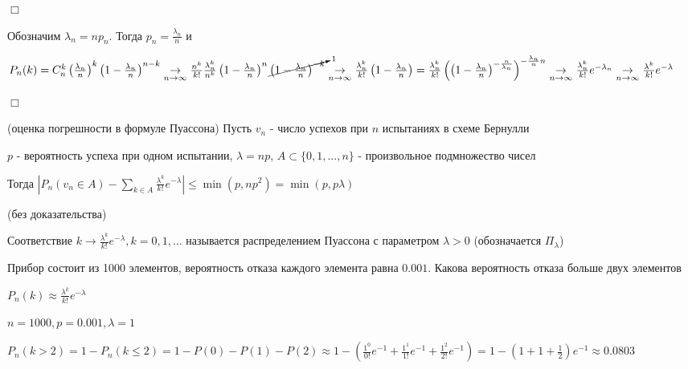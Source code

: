 \documentclass[12pt]{article}
\begin{document}
    \begin{MyProof}
        $\Box$

        Обозначим $\lambda_n = n p_n$. Тогда $p_n = \frac{\lambda_n}{n}$ и

        $P_n(k) = C^k_n \left(\frac{\lambda_n}{n}\right)^k \left(1 - \frac{\lambda_n}{n}\right)^{n - k} \underset{n \to \infty}{\rightarrow} \frac{n^k}{k!} \frac{\lambda^k_n}{n^k} \left(1 - \frac{\lambda_n}{n}\right)^n \cancelto{1}{\left(1 - \frac{\lambda_n}{n}\right)^{-k}}
        \underset{n \to \infty}{\rightarrow} \frac{\lambda_n^k}{k!} \left(1 - \frac{\lambda_n}{n}\right) = \frac{\lambda_n^k}{k!} \left(\left(1 - \frac{\lambda_n}{n}\right)^{-\frac{n}{\lambda_n}}\right)^{-\frac{\lambda_n}{n}n} \underset{n \to \infty}{\rightarrow} \frac{\lambda_n^k}{k!} e^{-\lambda_n} \underset{n \to \infty}{\rightarrow} \frac{\lambda^k}{k!} e^{-\lambda}$

        $\Box$
    \end{MyProof}

    \begin{MyTheorem}
         (оценка погрешности в формуле Пуассона) Пусть $v_n$ - число успехов при $n$ испытаниях в схеме Бернулли

        $p$ - вероятность успеха при одном испытании, $\lambda = np$, $A \subset \{0, 1, \dots, n\}$ - произвольное подмножество чисел

        Тогда $|P_n (v_n \in A) - \sum_{k \in A} \frac{\lambda^k}{k!} e^{-\lambda}| \leq \min (p, np^2) = \min (p, p\lambda)$

        (без доказательства)
    \end{MyTheorem}

    \Def Соответствие $k \to \frac{\lambda^k}{k!} e^{-\lambda}, k = 0, 1, \dots$ называется распределением Пуассона
    с параметром $\lambda > 0$ (обозначается $\Pi_\lambda$)

    \Ex Прибор состоит из 1000 элементов, вероятность отказа каждого элемента равна $0.001$. Какова вероятность отказа больше двух элементов

    $P_n(k) \approx \frac{\lambda^k}{k!} e^{-\lambda}$

    $n = 1000, p = 0.001, \lambda = 1$

    $P_n(k > 2) = 1 - P_n (k \leq 2) = 1 - P(0) - P(1) - P(2) \approx 1 - \left(\frac{1^0}{0!} e^{-1} + \frac{1^1}{1!} e^{-1} + \frac{1^2}{2!} e^{-1}\right) =
    1 - \left(1 + 1 + \frac{1}{2}\right) e^{-1} \approx 0.0803$
\end{document}

